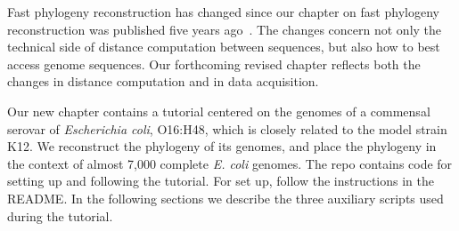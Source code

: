 Fast phylogeny reconstruction has changed since our chapter on fast
phylogeny reconstruction was published five years
ago~\cite{hau21:fas}. The changes concern not only the technical side
of distance computation between sequences, but also how to best access
genome sequences. Our forthcoming revised chapter reflects both the
changes in distance computation and in data acquisition.

Our new chapter contains a tutorial centered on the genomes of a
commensal serovar of \emph{Escherichia coli}, O16:H48, which is
closely related to the model strain K12. We reconstruct the phylogeny
of its genomes, and place the phylogeny in the context of almost 7,000
complete \emph{E. coli} genomes. The  repo contains code for
setting up and following the tutorial. For set up, follow the
instructions in the README. In the following sections we describe the
three auxiliary scripts used during the tutorial.
